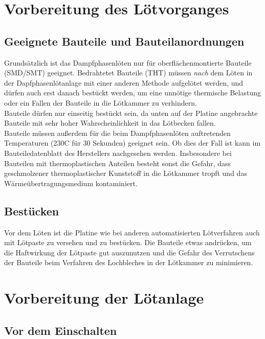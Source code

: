 \documentclass{\basedir/fablab-document}
\begin{document}
	\section{Vorbereitung des L{\"o}tvorganges}
	\subsection{Geeignete Bauteile und Bauteilanordnungen}
	
	
	Grunds{\"a}tzlich ist das Dampfphasenl{\"o}ten nur f{\"u}r oberfl{\"a}chenmontierte Bauteile (SMD/SMT) geeignet. Bedrahtetet Bauteile (THT) m{\"u}ssen \textit{nach} dem L{\"o}ten in der Dapfphasenl{\"o}tanlage mit einer anderen Methode aufgel{\"o}tet werden, und d{\"u}rfen auch erst danach best{\"u}ckt werden, um eine unn{\"o}tige thermische Belastung oder ein Fallen der Bauteile in die L{\"o}tkammer zu verhindern.\\

Bauteile d{\"u}rfen nur einseitig best{\"u}ckt sein, da unten auf der Platine angebrachte Bauteile mit sehr hoher Wahrscheinlichkeit in das L{\"o}tbecken fallen. \\

Bauteile m{\"u}ssen au{\ss}erdem f{\"u}r die beim Dampfphasenl{\"o}ten auftretenden Temperaturen (230\textdegree C f{\"u}r 30 Sekunden) geeignet sein. Ob dies der Fall ist kann im Bauteiledatenblatt des Herstellers nachgesehen werden. Insbesondere bei Bauteilen mit thermoplastischen Anteilen besteht sonst die Gefahr, dass geschmolzener thermoplastischer Kunststoff in die L{\"o}tkammer tropft und das W{\"a}rme{\"u}bertragungsmedium kontaminiert.


\subsection{Best{\"u}cken}

Vor dem L{\"o}ten ist die Platine wie bei anderen automatisierten L{\"o}tverfahren auch mit L{\"o}tpaste zu versehen und zu best{\"u}cken. Die Bauteile etwas andr{\"u}cken, um die Haftwirkung der L{\"o}tpaste gut auszunutzen und die Gefahr des Verrutschens der Bauteile beim Verfahren des Lochbleches in der L{\"o}tkammer zu minimieren.

\section{Vorbereitung der L{\"o}tanlage}
\subsection{Vor dem Einschalten}
\end{document}
